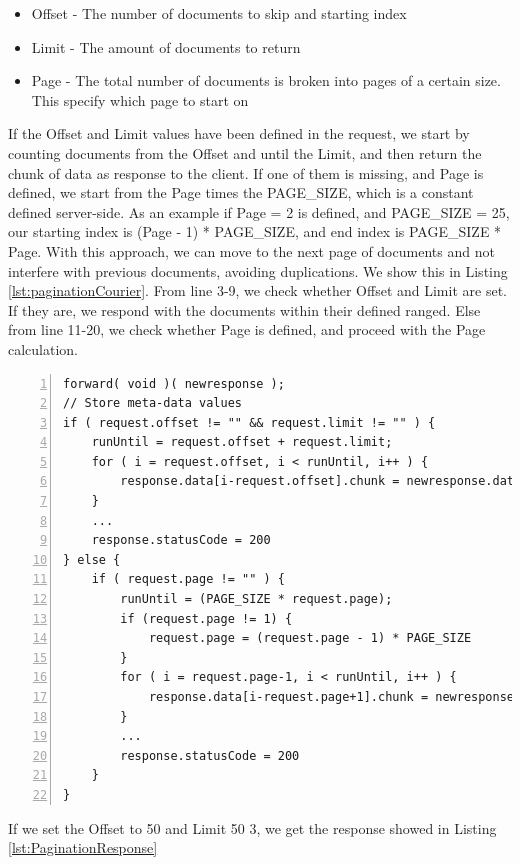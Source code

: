 \documentclass[12pt]{article}
\begin{document}
\begin{itemize}
    \item Offset - The number of documents to skip and starting index
    \item Limit - The amount of documents to return
    \item Page - The total number of documents is broken into pages of a certain size. This specify which page to start on
\end{itemize}

If the Offset and Limit values have been defined in the request, we start by counting documents from the Offset and until the Limit, and then return the chunk of data as response to the client. If one of them is missing, and Page is defined, we start from the Page times the PAGE\_SIZE, which is a constant defined server-side. As an example if Page = 2 is defined, and PAGE\_SIZE = 25, our starting index is (Page - 1) * PAGE\_SIZE, and end index is PAGE\_SIZE * Page. With this approach, we can move to the next page of documents and not interfere with previous documents, avoiding duplications. We show this in Listing \ref{lst:paginationCourier}. From line 3-9, we check whether Offset and Limit are set. If they are, we respond with the documents within their defined ranged. Else from line 11-20, we check whether Page is defined, and proceed with the Page calculation.
\\
\begin{lstlisting}[caption=Courier operations for the Pagination Service, 
    captionpos=b, label={lst:paginationCourier}, frame=single, breaklines=true, numbers=left, basicstyle=\scriptsize]
forward( void )( newresponse );
// Store meta-data values
if ( request.offset != "" && request.limit != "" ) {
    runUntil = request.offset + request.limit;
    for ( i = request.offset, i < runUntil, i++ ) {
        response.data[i-request.offset].chunk = newresponse.data[i].chunk
    }
    ...
    response.statusCode = 200
} else {
    if ( request.page != "" ) {
        runUntil = (PAGE_SIZE * request.page);
        if (request.page != 1) {
            request.page = (request.page - 1) * PAGE_SIZE
        }
        for ( i = request.page-1, i < runUntil, i++ ) {
            response.data[i-request.page+1].chunk = newresponse.data[i].chunk
        }
        ...
        response.statusCode = 200
    }
}   
\end{lstlisting}

If we set the Offset to 50 and Limit 50 3, we get the response showed in Listing \ref{lst:PaginationResponse}
\end{document}
